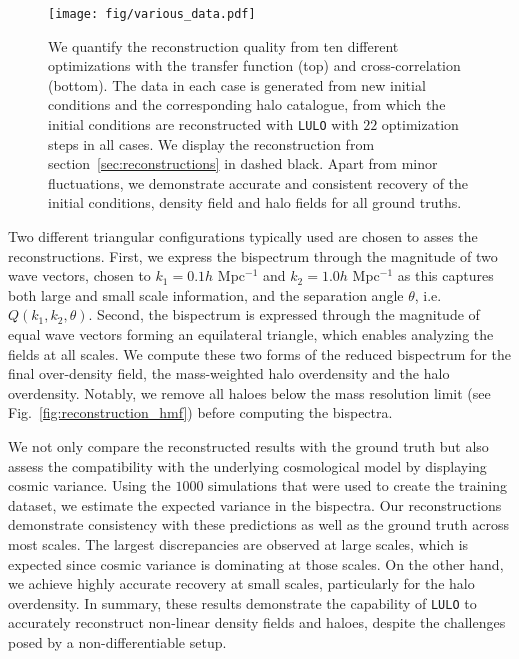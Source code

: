 \begin{figure*}
    \centering
    \texttt{[image: fig/various\_data.pdf]}
    \vspace{-0.55em}
    \caption{We quantify the reconstruction quality from ten different optimizations with the transfer function (top) and cross-correlation (bottom). The data in each case is generated from new initial conditions and the corresponding halo catalogue, from which the initial conditions are reconstructed with \texttt{LULO} with $22$ optimization steps in all cases. We display the reconstruction from section~\ref{sec:reconstructions} in dashed black. Apart from minor fluctuations, we demonstrate accurate and consistent recovery of the initial conditions, density field and halo fields for all ground truths.}
    \label{fig:various_data}
\end{figure*}

Two different triangular configurations typically used \citep[see e.g.][]{Jamieson2022b,Doeser2024,Jamieson2024,Bartlett2024} are chosen to asses the reconstructions. First, we express the bispectrum through the magnitude of two wave vectors, chosen to $k_1=0.1h$ Mpc$^{-1}$ and $k_2=1.0h$ Mpc$^{-1}$ as this captures both large and small scale information, and the separation angle $\theta$, i.e. $Q\left(k_1, k_2, \theta \right)$. Second, the bispectrum is expressed through the magnitude of equal wave vectors forming an equilateral triangle, which enables analyzing the fields at all scales. We compute these two forms of the reduced bispectrum for the final over-density field, the mass-weighted halo overdensity and the halo overdensity. Notably, we remove all haloes below the mass resolution limit (see Fig.~\ref{fig:reconstruction_hmf}) before computing the bispectra.

We not only compare the reconstructed results with the ground truth but also assess the compatibility with the underlying cosmological model by displaying cosmic variance. Using the $1000$ simulations that were used to create the training dataset, we estimate the expected variance in the bispectra. Our reconstructions demonstrate consistency with these predictions as well as the ground truth across most scales. The largest discrepancies are observed at large scales, which is expected since cosmic variance is dominating at those scales. On the other hand, we achieve highly accurate recovery at small scales, particularly for the halo overdensity. In summary, these results demonstrate the capability of \texttt{LULO} to accurately reconstruct non-linear density fields and haloes, despite the challenges posed by a non-differentiable setup.


